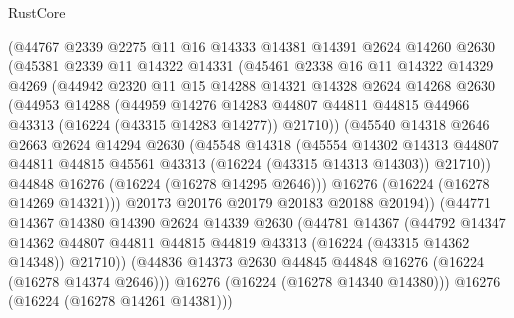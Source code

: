 \begin{lexlean}{RustCore}
\begin{coremodule}
          (@44767
            @2339
            @2275
            @11
            @16
            @14333
            @14381
            @14391
            @2624
            @14260
            @2630
            (@45381
              @2339
              @11
              @14322
              @14331
              (@45461
                @2338
                @16
                @11
                @14322
                @14329
                @4269
                (@44942
                  @2320
                  @11
                  @15
                  @14288
                  @14321
                  @14328
                  @2624
                  @14268
                  @2630
                  (@44953
                    @14288
                    (@44959
                      @14276
                      @14283
                      @44807
                      @44811
                      @44815
                      @44966
                      @43313
                      (@16224 (@43315 @14283 @14277))
                      @21710))
                  (@45540
                    @14318
                    @2646
                    @2663
                    @2624
                    @14294
                    @2630
                    (@45548
                      @14318
                      (@45554
                        @14302
                        @14313
                        @44807
                        @44811
                        @44815
                        @45561
                        @43313
                        (@16224 (@43315 @14313 @14303))
                        @21710))
                    @44848
                    @16276
                    (@16224 (@16278 @14295 @2646)))
                  @16276
                  (@16224 (@16278 @14269 @14321)))
                @20173
                @20176
                @20179
                @20183
                @20188
                @20194))
            (@44771
              @14367
              @14380
              @14390
              @2624
              @14339
              @2630
              (@44781
                @14367
                (@44792
                  @14347
                  @14362
                  @44807
                  @44811
                  @44815
                  @44819
                  @43313
                  (@16224 (@43315 @14362 @14348))
                  @21710))
              (@44836 @14373 @2630 @44845 @44848 @16276 (@16224 (@16278 @14374 @2646)))
              @16276
              (@16224 (@16278 @14340 @14380)))
            @16276
            (@16224 (@16278 @14261 @14381)))

\end{coremodule}
\end{lexlean}
